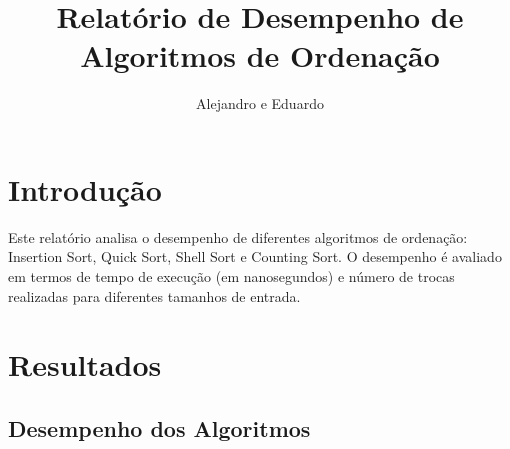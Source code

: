 \documentclass{article}
\title{Relatório de Desempenho de Algoritmos de Ordenação}
\author{Alejandro e Eduardo}
\date{}
\begin{document}
\maketitle

\section{Introdução}
Este relatório analisa o desempenho de diferentes algoritmos de ordenação: Insertion Sort, Quick Sort, Shell Sort e Counting Sort. O desempenho é avaliado em termos de tempo de execução (em nanosegundos) e número de trocas realizadas para diferentes tamanhos de entrada.

\section{Resultados}

\subsection{Desempenho dos Algoritmos}
\end{document}
